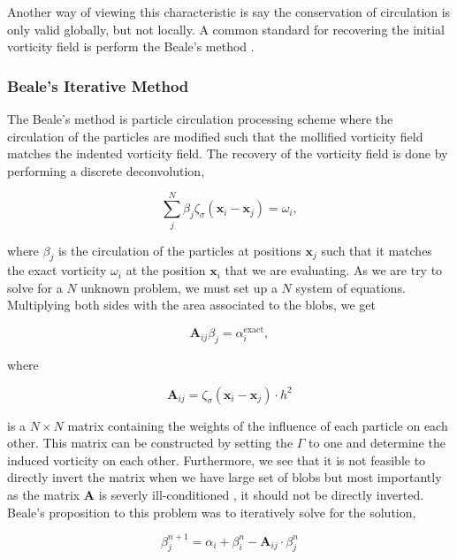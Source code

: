 Another way of viewing this characteristic is say the conservation of circulation is only valid globally, but not locally. A common standard for recovering the initial vorticity field is perform the Beale's method \cite{Beale1988}.




\subsubsection*{Beale's Iterative Method}

The Beale's method is particle circulation processing scheme where the circulation of the particles are modified such that the mollified vorticity field matches the indented vorticity field. The recovery of the vorticity field is done by performing a discrete deconvolution,

	\begin{equation}
	\sum_j^N \beta_j \zeta_{\sigma}\left(\mathbf{x}_i-\mathbf{x}_j\right) = \omega_i,
		\end{equation}

where $\beta_j$ is the circulation of the particles at positions $\mathbf{x}_j$ such that it matches the exact vorticity $\omega_i$ at the position $\mathbf{x}_i$ that we are evaluating.  As we are try to solve for a $N$ unknown problem, we must set up a $N$ system of equations. Multiplying both sides with the area associated to the blobs, we get

	\begin{equation}
	\mathbf{A}_{ij} \beta_j = \alpha_i^{\mathrm{exact}},
	\end{equation}
	
where

	\begin{equation}
	\mathbf{A}_{ij} = \zeta_{\sigma}\left(\mathbf{x}_i - \mathbf{x}_j\right) \cdot h^2
	\end{equation}

is a $N \times N$ matrix containing the weights of the influence of each particle on each other. This matrix can be constructed by setting the $\Gamma$ to one and determine the induced vorticity on each other. Furthermore, we see that it is not feasible to directly invert the matrix when we have large set of blobs but most importantly as the matrix $\mathbf{A}$ is severly ill-conditioned \cite{Speck2011a}, it should not be directly inverted. Beale's proposition to this problem was to iteratively solve for the solution,

	\begin{equation}
	\beta_{j}^{n+1} = \alpha_i + \beta_i^n - \mathbf{A}_{ij}\cdot\beta_j^n
	\end{equation}
	
